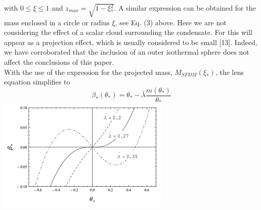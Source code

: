\documentclass{article}
\begin{document}
\begin{multicols}{2}[]
\begin{equation}
\end{equation}
\\with $0\leq{\xi}\leq1$ and $z_{max}=\sqrt{1-\xi{^2_*}}$. A similar expression can be obtained for the mass enclosed in a
circle or radius $\xi$, see Eq. (3) above. Here we are not
considering the effect of a scalar cloud surrounding the
condensate. For  this will appear as a projection
effect, which is usually considered to be small [13]. Indeed, we have corroborated that the inclusion of an outer
isothermal sphere does not affect the conclusions of this
paper.
\\With the use of the expression for the projected mass, $M_{SFDM}(\xi_*)$, the lens equation simplifies to
\begin{equation}
    \beta_*(\theta_*)=\theta_*-\bar{\lambda}\frac{m(\theta_*)}{\theta_*}
\end{equation}
\includegraphics{img1.png}


\end{multicols}
\end{document}
